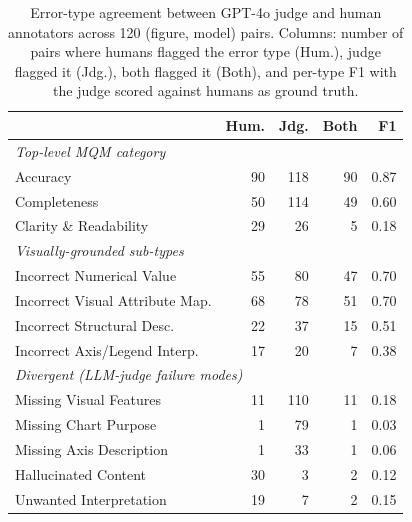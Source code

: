 \begin{table}[t]
\centering
\footnotesize
\setlength{\tabcolsep}{4pt}
\begin{tabular}{lrrrr}
\toprule
& \textbf{Hum.} & \textbf{Jdg.} & \textbf{Both} & \textbf{F1} \\
\midrule
\multicolumn{5}{l}{\emph{Top-level MQM category}} \\
Accuracy                          & 90 & 118 & 90 & 0.87 \\
Completeness                      & 50 & 114 & 49 & 0.60 \\
Clarity \& Readability            & 29 & 26  & 5  & 0.18 \\
\midrule
\multicolumn{5}{l}{\emph{Visually-grounded sub-types}} \\
Incorrect Numerical Value         & 55 & 80  & 47 & 0.70 \\
Incorrect Visual Attribute Map.   & 68 & 78  & 51 & 0.70 \\
Incorrect Structural Desc.        & 22 & 37  & 15 & 0.51 \\
Incorrect Axis/Legend Interp.     & 17 & 20  & 7  & 0.38 \\
\midrule
\multicolumn{5}{l}{\emph{Divergent (LLM-judge failure modes)}} \\
Missing Visual Features           & 11 & 110 & 11 & 0.18 \\
Missing Chart Purpose             & 1  & 79  & 1  & 0.03 \\
Missing Axis Description          & 1  & 33  & 1  & 0.06 \\
Hallucinated Content              & 30 & 3   & 2  & 0.12 \\
Unwanted Interpretation           & 19 & 7   & 2  & 0.15 \\
\bottomrule
\end{tabular}
\caption{Error-type agreement between GPT-4o judge and human annotators across 120 (figure, model) pairs. Columns: number of pairs where humans flagged the error type (Hum.), judge flagged it (Jdg.), both flagged it (Both), and per-type F1 with the judge scored against humans as ground truth.}
\label{tab:error-type-agreement}
\end{table}
